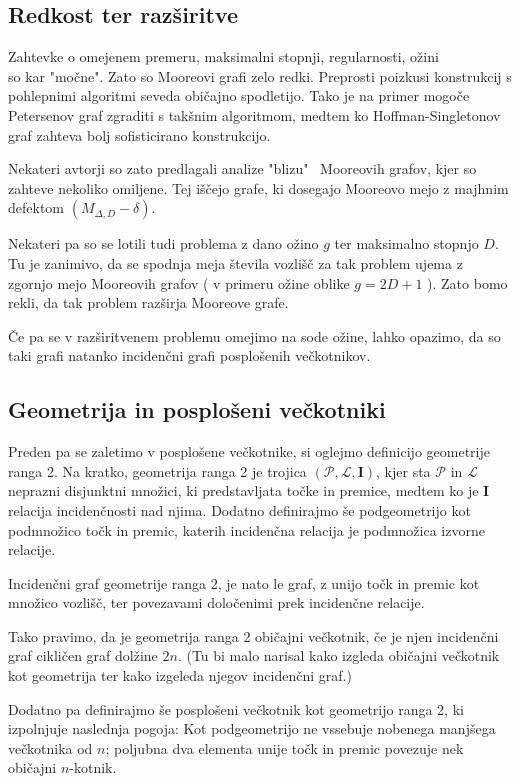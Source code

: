 \documentclass{fmfkpb}
\newcommand{\II}{\mathbf{I}}
\newcommand{\PP}{\mathcal{P}}
\newcommand{\LL}{\mathcal{L}}
\begin{document}
\subsection{Redkost ter razširitve}
Zahtevke o omejenem premeru, maksimalni stopnji, regularnosti, 
ožini\\ so kar "močne". Zato so Mooreovi grafi zelo redki. Preprosti 
poizkusi konstrukcij s pohlepnimi algoritmi seveda običajno spodletijo. 
Tako je na primer mogoče Petersenov graf zgraditi s takšnim
algoritmom, medtem ko Hoffman-Singletonov graf zahteva bolj
sofisticirano konstrukcijo. 

Nekateri avtorji so zato predlagali analize "blizu" ~Mooreovih grafov, 
kjer so zahteve nekoliko omiljene. Tej iščejo grafe, ki dosegajo 
Mooreovo mejo z majhnim defektom $\left(M_{\Delta, D} - \delta\right)$.

Nekateri pa so se lotili tudi problema z dano ožino $g$ ter 
maksimalno stopnjo $D$. Tu je zanimivo, da se spodnja meja števila 
vozlišč za tak problem ujema z zgornjo mejo Mooreovih grafov (
    v primeru ožine oblike $g = 2D + 1$
). Zato bomo rekli, da tak problem razširja Mooreove grafe. 

Če pa se v razširitvenem problemu omejimo na sode ožine, lahko 
opazimo, da so taki grafi natanko incidenčni grafi 
posplošenih večkotnikov.

\subsection{Geometrija in posplošeni večkotniki}
Preden pa se zaletimo v posplošene večkotnike, si oglejmo 
definicijo geometrije ranga 2. Na kratko, geometrija ranga 2 je trojica $\left(\PP, \LL, \II\right)$,
kjer sta $\PP$ in $\LL$ neprazni disjunktni množici, ki predstavljata 
točke in premice, medtem ko je $\II$ relacija incidenčnosti nad njima. 
Dodatno definirajmo še podgeometrijo kot podmnožico točk in premic, katerih 
incidenčna relacija je podmnožica izvorne relacije. 

Incidenčni graf geometrije ranga 2, je nato le graf, z unijo 
točk in premic kot množico vozlišč, ter povezavami določenimi prek 
incidenčne relacije. 

Tako pravimo, da je geometrija ranga 2 običajni večkotnik, če je njen
incidenčni graf cikličen graf dolžine $2n$. (Tu bi malo narisal kako izgleda 
običajni večkotnik kot geometrija ter kako izgeleda njegov incidenčni graf.)

Dodatno pa definirajmo še posplošeni večkotnik kot geometrijo ranga 2, ki
izpolnjuje naslednja pogoja: 
Kot podgeometrijo ne vssebuje nobenega manjšega večkotnika od $n$;
poljubna dva elementa unije točk in premic povezuje nek običajni $n$-kotnik. 
\end{document}
